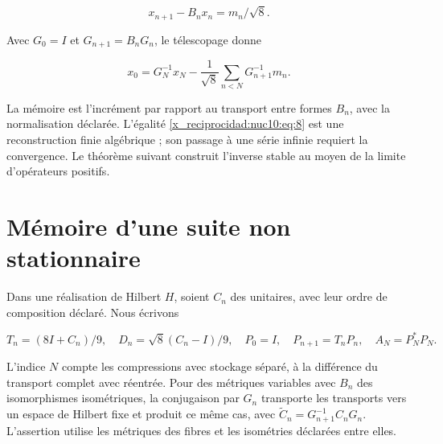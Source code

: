 \begin{equation}
x_{n+1}-B_nx_n=m_n/\sqrt8.
\label{x_reciprocidad:nuc10:eq:7}
\end{equation}



Avec \(G_0=I\) et \(G_{n+1}=B_nG_n\), le télescopage donne



\begin{equation}
x_0=G_N^{-1}x_N-\frac1{\sqrt8}\sum_{n<N}G_{n+1}^{-1}m_n.
\label{x_reciprocidad:nuc10:eq:8}
\end{equation}



La mémoire est l’incrément par rapport au transport entre formes \(B_n\), avec la normalisation déclarée. L’égalité \eqref{x_reciprocidad:nuc10:eq:8} est une reconstruction finie algébrique ; son passage à une série infinie requiert la convergence. Le théorème suivant construit l’inverse stable au moyen de la limite d’opérateurs positifs.

\section{Mémoire d’une suite non stationnaire}

Dans une réalisation de Hilbert \(H\), soient \(C_n\) des unitaires, avec leur ordre de composition déclaré. Nous écrivons



\[
T_n=(8I+C_n)/9,\quad D_n=\sqrt8(C_n-I)/9,
\quad P_0=I,\quad P_{n+1}=T_nP_n,\quad A_N=P_N^*P_N.
\]



L’indice \(N\) compte les compressions avec stockage séparé, à la différence du transport complet avec réentrée. Pour des métriques variables avec \(B_n\) des isomorphismes isométriques, la conjugaison par \(G_n\) transporte les transports vers un espace de Hilbert fixe et produit ce même cas, avec \(\widetilde C_n=G_{n+1}^{-1}C_nG_n\). L’assertion utilise les métriques des fibres et les isométries déclarées entre elles.

